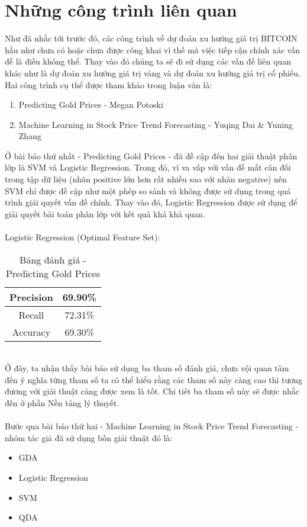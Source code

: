 \chapter{Những công trình liên quan}
Như đã nhắc tới trước đó, các công trình về dự đoán xu hướng giá trị BITCOIN 
hầu như chưa có hoặc chưa được công khai vì thế mà việc tiếp cận chính xác vấn 
đề là điều không thể. Thay vào đó chúng ta sẽ đi sử dụng các vấn đề liên quan 
khác như là dự đoán xu hướng giá trị vàng và dự đoán xu hướng giá trị cổ phiếu.
Hai công trình cụ thể được tham khảo trong luận văn là:
\begin{enumerate}
\item Predicting Gold Prices - Megan Potoski \cite{PredictingGoldPrices}
\item Machine Learning in Stock Price Trend Forecasting - Yuqing Dai \& 
Yuning Zhang \cite{StockPriceTrendForecasting} 
\end{enumerate}
Ở bài báo thứ nhất - Predicting Gold Prices - đã đề cập đến hai giải thuật phân lớp 
là SVM và Logistic Regression. Trong đó, vì va vấp với vấn đề mất cân đối trong tập 
dữ liệu (nhãn positive lớn hơn rất nhiều sao với nhãn negative) nên SVM chỉ được 
đề cập như một phép so sánh và không được sử dụng trong quá trình giải quyết vấn 
đề chính. Thay vào đó, Logistic Regression được sử dụng để giải quyết bài toán 
phân lớp với kết quả khá khả quan.\\\\
Logistic Regression (Optimal Feature Set):
\begin{table}[h]
\centering
\begin{tabular}{ |c|c| }
\hline
Precision & 69.90\% \\
\hline
Recall & 72.31\% \\
\hline
Accuracy & 69.30\% \\
\hline
\end{tabular}
\caption{Bảng đánh giá - Predicting Gold Prices}
\end{table}\\
Ở đây, ta nhận thấy bài báo sử dụng ba tham số đánh giá, chưa vội quan tâm đến 
ý nghĩa từng tham số ta có thể hiểu rằng các tham số này càng cao thì tương 
đương với giái thuật càng được xem là tốt. Chi tiết ba tham số này sẽ được nhắc 
đến ở phần Nền tảng lý thuyết.\\\\
Bước qua bài báo thứ hai - Machine Learning in Stock Price Trend Forecasting - 
nhóm tác giả đã sử dụng bốn giải thuật đó là:\\
\begin{itemize}
\item GDA
\item Logistic Regression
\item SVM 
\item QDA
\end{itemize}
